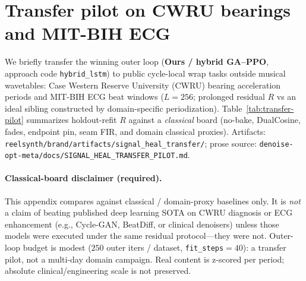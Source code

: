 
\section{Transfer pilot on CWRU bearings and MIT-BIH ECG}
\label{app:transfer-pilot}

We briefly transfer the winning outer loop (\textbf{Ours / hybrid GA--PPO}, approach code \texttt{hybrid\_lstm})
to public cycle-local wrap tasks outside musical wavetables:
Case Western Reserve University (CWRU) bearing acceleration periods and MIT-BIH ECG beat windows
($L{=}256$; prolonged residual $R$ vs an ideal sibling constructed by domain-specific periodization).
Table~\ref{tab:transfer-pilot} summarizes holdout-refit $R$ against a \emph{classical} board
(no-bake, DualCosine, fades, endpoint pin, seam FIR, and domain classical proxies).
Artifacts: \texttt{reelsynth/brand/artifacts/signal\_heal\_transfer/};
prose source: \texttt{denoise-opt-meta/docs/SIGNAL\_HEAL\_TRANSFER\_PILOT.md}.

\paragraph{Classical-board disclaimer (required).}
This appendix compares against classical / domain-proxy baselines only.
It is \emph{not} a claim of beating published deep learning SOTA on CWRU diagnosis or ECG enhancement
(e.g., Cycle-GAN, BeatDiff, or clinical denoisers) unless those models were executed under the same residual protocol---they were not.
Outer-loop budget is modest ($250$ outer iters / dataset, \texttt{fit\_steps}${}={}40$): a transfer pilot, not a multi-day domain campaign.
Real content is z-scored per period; absolute clinical/engineering scale is not preserved.


